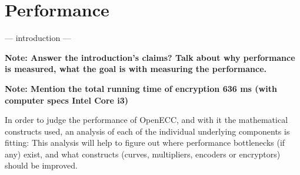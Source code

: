 \section{Performance}
\label{sec:performance}

 --- introduction ---
 
 \textbf{Note: Answer the introduction's claims? Talk about why performance is measured, what the goal is with measuring the
 performance.}
 
 \textbf{Note: Mention the total running time of encryption 636 ms (with computer specs Intel Core i3)}
 
 In order to judge the performance of OpenECC, and with it the mathematical constructs used, an analysis of each of the
 individual underlying components is fitting: This analysis will help to figure out where performance bottlenecks (if
 any) exist, and what constructs (curves, multipliers, encoders or encryptors) should be improved.


